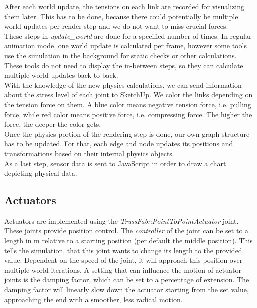 After each world update, the tensions on each link are recorded for visualizing them later. This has to be done, because there could potentially be multiple world updates per render step and we do not want to miss crucial forces.\\
These steps in \textit{update\_world} are done for a specified number of times. In regular animation mode, one world update is calculated per frame, however some tools use the simulation in the background for static checks or other calculations. These tools do not need to display the in-between steps, so they can calculate multiple world updates back-to-back.\\
With the knowledge of the new physics calculations, we can send information about the stress level of each joint to SketchUp. We color the links depending on the tension force on them. A blue color means negative tension force, i.e. pulling force, while red color means positive force, i.e. compressing force. The higher the force, the deeper the color gets.\\
Once the physics portion of the rendering step is done, our own graph structure has to be updated. For that, each edge and node updates its positions and transformations based on their internal physics objects.\\
As a last step, sensor data is sent to JavaScript in order to draw a chart depicting physical data.

\subsection{Actuators}
Actuators are implemented using the \textit{TrussFab::PointToPointActuator} joint. These joints provide position control. The \textit{controller} of the joint can be set to a length in m relative to a starting position (per default the middle position). This tells the simulation, that this joint wants to change its length to the provided value. Dependent on the speed of the joint, it will approach this position over multiple world iterations. A setting that can influence the motion of actuator joints is the damping factor, which can be set to a percentage of extension. The damping factor will linearly slow down the actuator starting from the set value, approaching the end with a smoother, less radical motion.

